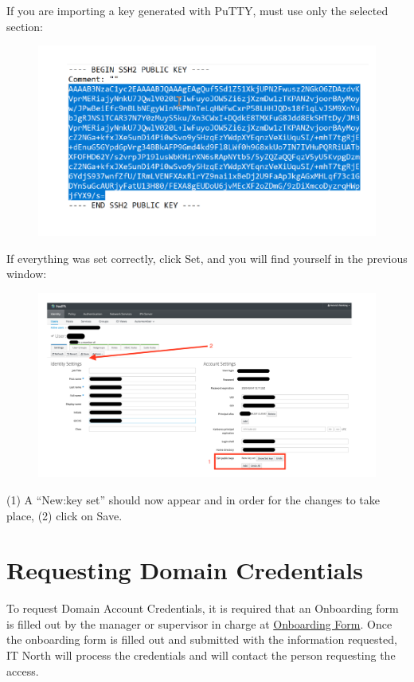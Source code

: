 If you are importing a key generated with PuTTY, must use only the selected section:

\begin{figure}
  \includegraphics[width=15cm]{Images/example15.png}
\end{figure}

\newpage

If everything was set correctly, click Set, and you will find yourself in the previous window:

\begin{figure}
  \includegraphics[width=16cm]{Images/example16.png}
\end{figure}

(1) A “New:key set” should now appear and in order for the changes to take place, (2) click on Save.

\newpage

\section{Requesting Domain Credentials}
\label{sec:Domain}

To request Domain Account Credentials, it is required that an Onboarding form is filled out by the manager or supervisor in charge at \href{https://project.lsst.org/onboarding/form}{Onboarding Form}. Once the onboarding form is filled out and submitted with the information requested, IT North will process the credentials and will contact the person requesting the access.

